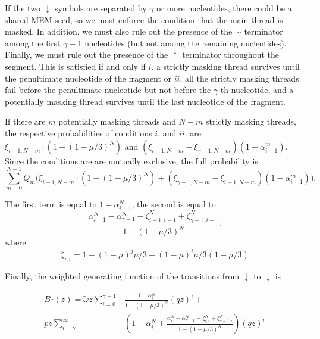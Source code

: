 \documentclass{article}
\begin{document}
If the two $\downarrow$ symbols are separated by $\gamma$ or more
nucleotides, there could be a shared MEM seed, so we must enforce the
condition that the main thread is masked. In addition, we must also rule
out the presence of the $\sim$ terminator among the first $\gamma-1$
nucleotides (but not among the remaining nucleotides). Finally, we must
rule out the presence of the $\uparrow$ terminator throughout the segment.
This is satisfied if and only if $i.$ a strictly masking thread survives
until the penultimate nucleotide of the fragment or $ii.$ all the strictly
masking threads fail before the penultimate nucleotide but not before the
$\gamma$-th nucleotide, and a potentially masking thread survives until
the last nucleotide of the fragment.

If there are $m$ potentially masking threads and $N-m$ strictly masking
threads, the respective probabilities of conditions $i.$ and $ii.$ are
$\xi_{i-1,N-m} \cdot (1-(1-\mu/3)^N)$ and $(\xi_{i-1,N-m}
-\xi_{\gamma-1,N-m})(1-\alpha_{i-1}^m)$. Since the conditions are
are mutually exclusive, the full probability is
\begin{equation}
\sum_{m=0}^{N-1}Q_m \bigg(\xi_{i-1,N-m} \cdot (1-(1-\mu/3)^N) +
(\xi_{\gamma-1,N-m}-\xi_{i-1,N-m})(1-\alpha_{i-1}^m) \bigg).
\end{equation}

The first term is equal to $1-\alpha_{i-1}^N$, the second is equal to
\begin{equation}
\frac{\alpha_{i-1}^N - \alpha_{\gamma-1}^N -
  \zeta_{i-1,i-1}^N + \zeta_{\gamma-1,i-1}^N}{1-(1-\mu/3)^N}.
\end{equation}
where
\begin{equation}
\zeta_{j,i} = 1-(1-\mu)^j\mu/3-(1-\mu)^i\mu/3(1-\mu/3)
\end{equation}

Finally, the weighted generating function of the transitions from
$\downarrow$ to $\downarrow$ is

\begin{equation*}
\begin{split}
B^\downarrow(z) = \tilde{\omega} z \sum_{i=0}^{\gamma-1}
& \frac{1-\alpha_i^N}{1-(1-\mu/3)^N} (qz)^i + \\
pz\sum_{i=\gamma}^\infty & \left( 1-\alpha_i^N + 
\frac{\alpha_i^N - \alpha_{\gamma-1}^N -
  \zeta_{i,i}^N + \zeta_{\gamma-1,i}^N}{1-(1-\mu/3)^N} \right)
(qz)^i
\end{split}
\end{equation*}
\end{document}

